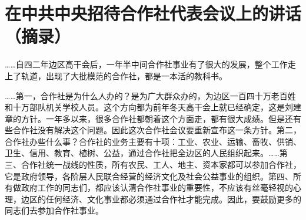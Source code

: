 \section[在中共中央招待合作社代表会议上的讲话（摘录）（一九四四年）]{在中共中央招待合作社代表会议上的讲话（摘录）}


……自四二年边区高干会后，一年半中间合作社事业有了很大的发展，整个工作走上了轨道，出现了大批模范的合作社，都是一本活的教科书。

……第一，合作社是为什么人办的？是为广大群众办的，为边区一百四十万老百姓和十万部队机关学校人员。这个方向都为前年冬天高干会上就已经确定，这是刘建章的方针。一年多以来，很多合作社都朝着这个方面走，都有很大成绩。但是还有些合作社没有解决这个问题。因此这次合作社会议要重新宣布这一条方针。第二，合作社办些什么事？合作社的业务主要有十项：工业、农业、运输、畜牧、供销、卫生、信用、教育、植树、公益，通过合作社把全边区的人民组织起来。……第三、合作社统一战线的性质，所有农民、工人、地主、资本家都可以参加合作社，它是政府领导，各阶层人民联合经营的经济文化及社会公益事业的组织。第四、所有做政府工作的同志们，都应该认清合作社事业的重要性，不应该有丝毫轻视的心理，边区的任何经济、文化事业都必须通过合作社才能完成。因此，要鼓励更多的同志们去参加合作社事业。

